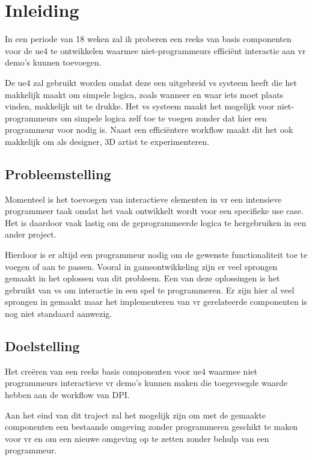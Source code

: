 \chapter{Inleiding}

In een periode van 18 weken zal ik proberen een reeks van basis componenten voor de \gls{ue4} te ontwikkelen waarmee niet-programmeurs efficiënt interactie aan \gls{vr} demo’s kunnen toevoegen.

De \gls{ue4} zal gebruikt worden omdat deze een uitgebreid \gls{vs} systeem heeft die het makkelijk maakt om simpele logica, zoals wanneer en waar iets moet plaats vinden, makkelijk uit te drukke. Het \gls{vs} systeem maakt het mogelijk voor niet-programmeurs om simpele logica zelf toe te voegen zonder dat hier een programmeur voor nodig is. Naast een efficiëntere workflow maakt dit het ook makkelijk om als designer, 3D artist te experimenteren.

\section{Probleemstelling}

Momenteel is het toevoegen van interactieve elementen in \gls{vr} een intensieve programmeer taak omdat het vaak ontwikkelt wordt voor een specifieke use case. Het is daardoor vaak lastig om de geprogrammeerde logica te hergebruiken in een ander project. 

Hierdoor is er altijd een programmeur nodig om de gewenste functionaliteit toe te voegen of aan te passen. Vooral in gameontwikkeling zijn er veel sprongen gemaakt in het oplossen van dit probleem. Een van deze oplossingen is het gebruikt van \gls{vs} om interactie in een spel te programmeren. Er zijn hier al veel sprongen in gemaakt maar het implementeren van \gls{vr} gerelateerde componenten is nog niet standaard aanwezig.

\section{Doelstelling}

Het creëren van een reeks basis componenten voor \gls{ue4} waarmee niet programmeurs interactieve \gls{vr} demo’s kunnen maken die toegevoegde waarde hebben aan de workflow van DPI.

Aan het eind van dit traject zal het mogelijk zijn om met de gemaakte componenten een bestaande omgeving zonder programmeren geschikt te maken voor \gls{vr} en om een nieuwe omgeving op te zetten zonder behulp van een programmeur.


